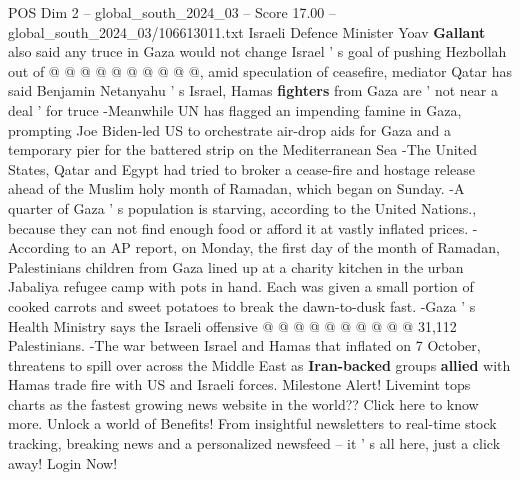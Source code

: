 \begin{textsample}{POS Dim 2 – global\_south\_2024\_03 – Score 17.00 – global\_south\_2024\_03/106613011.txt}
Israeli Defence Minister Yoav \textbf{Gallant} also said any truce in Gaza would not change Israel ' s goal of pushing Hezbollah out of @ @ @ @ @ @ @ @ @ @, amid speculation of ceasefire, mediator Qatar has said Benjamin Netanyahu ' s Israel, Hamas \textbf{fighters} from Gaza are ' not near a deal ' for truce -Meanwhile UN has flagged an impending famine in Gaza, prompting Joe Biden-led US to orchestrate air-drop aids for Gaza and a temporary pier for the battered strip on the Mediterranean Sea -The United States, Qatar and Egypt had tried to broker a cease-fire and hostage release ahead of the Muslim holy month of Ramadan, which began on Sunday. -A quarter of Gaza ' s population is starving, according to the United Nations., because they can not find enough food or afford it at vastly inflated prices. -According to an AP report, on Monday, the first day of the month of Ramadan, Palestinians children from Gaza lined up at a charity kitchen in the urban Jabaliya refugee camp with pots in hand.
Each was given a small portion of cooked carrots and sweet potatoes to break the dawn-to-dusk fast. -Gaza ' s Health Ministry says the Israeli offensive @ @ @ @ @ @ @ @ @ @ 31,112 Palestinians. -The war between Israel and Hamas that inflated on 7 October, threatens to spill over across the Middle East as \textbf{Iran-backed} groups \textbf{allied} with Hamas trade fire with US and Israeli forces.
Milestone Alert!
Livemint tops charts as the fastest growing news website in the world??
Click here to know more.
Unlock a world of Benefits!
From insightful newsletters to real-time stock tracking, breaking news and a personalized newsfeed -- it ' s all here, just a click away!
Login Now!

\end{textsample}
